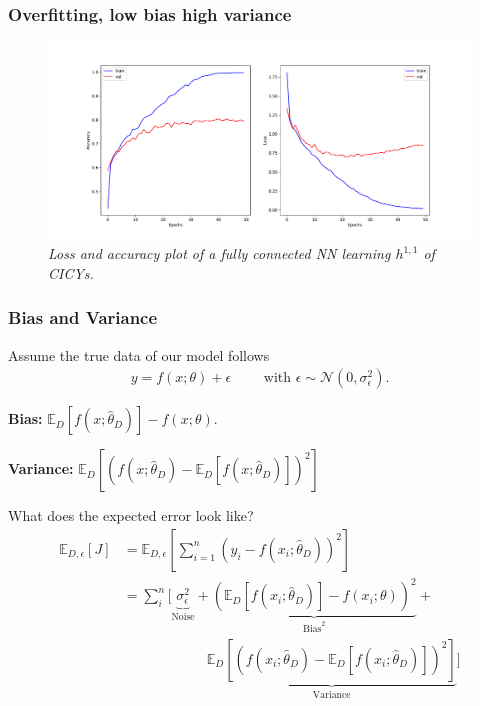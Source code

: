 \documentclass{beamer}
\begin{document}
\begin{frame}
\frametitle{Overfitting, low bias high variance}
\begin{figure}
\centering
\includegraphics[scale=0.33]{cicy_no_reg.pdf}
\caption{ \it Loss and accuracy plot of a fully connected NN learning $h^{1,1}$ of CICYs.}
\end{figure}
\end{frame}


\begin{frame}
\frametitle{Bias and Variance}
Assume the true data of our model follows
\begin{align}
y = f(x; \theta) + \epsilon \qquad \text{ with } \epsilon \sim \mathcal{N}(0, \sigma^2_\epsilon).
\end{align}

\textbf{Bias:} $\mathbb{E}_{D} [f(x;\hat{\theta}_D)] - f(x;\theta)$.

\textbf{Variance:} $\mathbb{E}_D[(f(x;\hat{\theta}_D) - \mathbb{E}_D[f(x;\hat{\theta}_D)])^2]$

What does the expected error look like?
\pause
\begin{align}
\mathbb{E}_{D,\epsilon} [J] &= \mathbb{E}_{D,\epsilon} \left[ \sum_{i=1}^n (y_i - f(x_i; \hat{\theta}_D))^2 \right] \nonumber \\
& = \sum_i^n \bigg[ \underbrace{\sigma^2_\epsilon}_{\text{Noise}} + \underbrace{(\mathbb{E}_D[f(x_i; \hat{\theta}_D)]-f(x_i; \theta) )^2}_{\text{Bias}^2} + \nonumber \\
& \qquad\qquad \qquad   \underbrace{\mathbb{E}_D[(f(x_i; \hat{\theta}_D) - \mathbb{E}_D[f(x_i; \hat{\theta}_D)])^2 ]}_{\text{Variance}} \bigg]
\end{align}
\end{frame}
\end{document}
